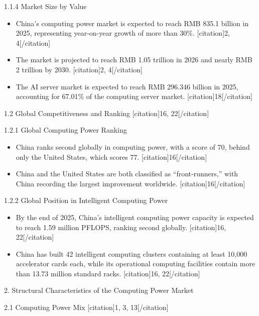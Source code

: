 \documentclass{huawei}
\begin{document}
\begin{tcolorbox}[
    title={Example of Hierarchical Research Outline},
    colback=gray!5,
    colframe=gray!40,
    fonttitle=\bfseries,
    boxrule=0.5pt,
    arc=2pt,
    breakable
]
\textcolor{TitleRed}{1.1.4 Market Size by Value}
\begin{itemize}[leftmargin=1em, listparindent=\parindent]
\item China’s computing power market is expected to reach RMB 835.1 billion in 2025, representing year-on-year growth of more than 30\%. [citation]2, 4[/citation]
\item The market is projected to reach RMB 1.05 trillion in 2026 and nearly RMB 2 trillion by 2030. [citation]2, 4[/citation]
\item The AI server market is expected to reach RMB 296.346 billion in 2025, accounting for 67.01\% of the computing server market. [citation]18[/citation]
\end{itemize}


\textcolor{TitleRed}{1.2 Global Competitiveness and Ranking [citation]16, 22[/citation]}

\textcolor{TitleRed}{1.2.1 Global Computing Power Ranking}
\begin{itemize}[leftmargin=1em, listparindent=\parindent]
\item China ranks second globally in computing power, with a score of 70, behind only the United States, which scores 77. [citation]16[/citation]
\item China and the United States are both classified as “front-runners,” with China recording the largest improvement worldwide. [citation]16[/citation]
\end{itemize}

\textcolor{TitleRed}{1.2.2 Global Position in Intelligent Computing Power}
\begin{itemize}[leftmargin=1em, listparindent=\parindent]
\item By the end of 2025, China’s intelligent computing power capacity is expected to reach 1.59 million PFLOPS, ranking second globally. [citation]16, 22[/citation]
\item China has built 42 intelligent computing clusters containing at least 10,000 accelerator cards each, while its operational computing facilities contain more than 13.73 million standard racks. [citation]16, 22[/citation]
\end{itemize}


\textcolor{TitleRed}{2. Structural Characteristics of the Computing Power Market}

\textcolor{TitleRed}{2.1 Computing Power Mix [citation]1, 3, 13[/citation]}


\end{tcolorbox}
\end{document}
